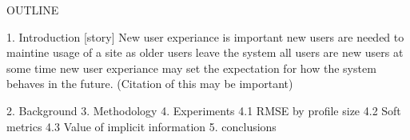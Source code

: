 OUTLINE

1. Introduction
  [story]
    New user experiance is important
      new users are needed to maintine usage of a site as older users leave the system
      all users are new users at some time
      new user experiance may set the expectation for how the system behaves in the future. (Citation of this may be important)
    
    
    
2. Background
3. Methodology
4. Experiments %
  4.1 RMSE by profile size
  4.2 Soft metrics
  4.3 Value of implicit information
5. conclusions
